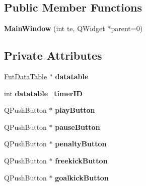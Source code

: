 \subsection*{Public Member Functions}
\begin{DoxyCompactItemize}
\item 
{\bfseries Main\+Window} (int te, Q\+Widget $\ast$parent=0)\hypertarget{classMainWindow_adfdfe65faaad0ae3b5e74a842c59f2e9}{}\label{classMainWindow_adfdfe65faaad0ae3b5e74a842c59f2e9}

\end{DoxyCompactItemize}
\subsection*{Private Attributes}
\begin{DoxyCompactItemize}
\item 
\hyperlink{classFutDataTable}{Fut\+Data\+Table} $\ast$ {\bfseries datatable}\hypertarget{classMainWindow_ae9dacdc2b4dc1a48cb20c52b9056cb03}{}\label{classMainWindow_ae9dacdc2b4dc1a48cb20c52b9056cb03}

\item 
int {\bfseries datatable\+\_\+timer\+ID}\hypertarget{classMainWindow_a548fe4c6ccd1f7f06aba7222f4521749}{}\label{classMainWindow_a548fe4c6ccd1f7f06aba7222f4521749}

\item 
Q\+Push\+Button $\ast$ {\bfseries play\+Button}\hypertarget{classMainWindow_a388bc60efd89e1e8e82bef7b305f9902}{}\label{classMainWindow_a388bc60efd89e1e8e82bef7b305f9902}

\item 
Q\+Push\+Button $\ast$ {\bfseries pause\+Button}\hypertarget{classMainWindow_a06b43f9453bc30188eb290b85813d2cf}{}\label{classMainWindow_a06b43f9453bc30188eb290b85813d2cf}

\item 
Q\+Push\+Button $\ast$ {\bfseries penalty\+Button}\hypertarget{classMainWindow_a7d23dcad7ff6895e31794db467ad9059}{}\label{classMainWindow_a7d23dcad7ff6895e31794db467ad9059}

\item 
Q\+Push\+Button $\ast$ {\bfseries freekick\+Button}\hypertarget{classMainWindow_affe4d50a4ea4ee16a5c709d043baad3b}{}\label{classMainWindow_affe4d50a4ea4ee16a5c709d043baad3b}

\item 
Q\+Push\+Button $\ast$ {\bfseries goalkick\+Button}\hypertarget{classMainWindow_a4c02d85eca44e30cef7bb92009798ac2}{}\label{classMainWindow_a4c02d85eca44e30cef7bb92009798ac2}


\end{DoxyCompactItemize}
